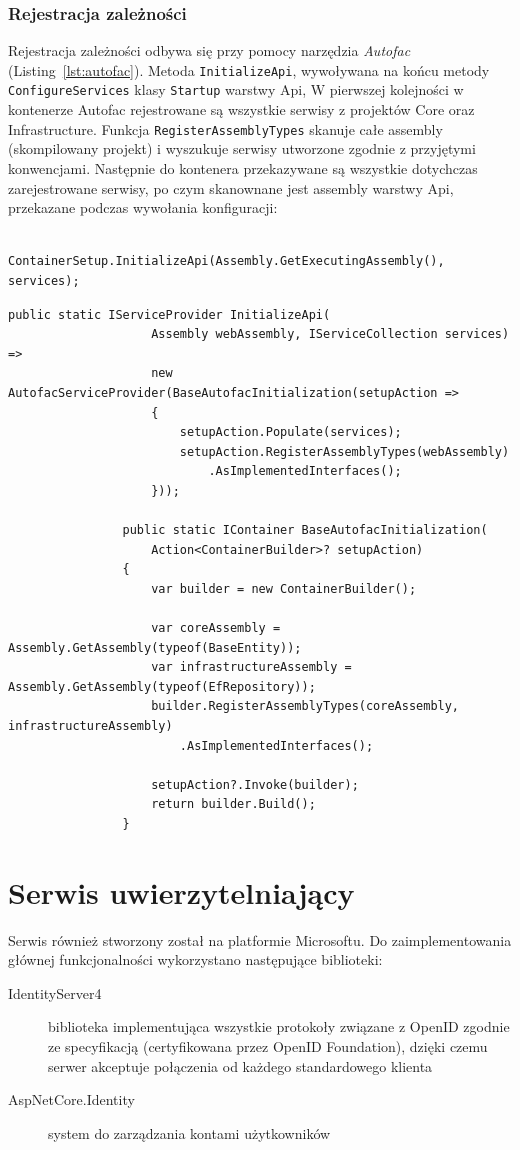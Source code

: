 		\subsubsection*{Rejestracja zależności}
			Rejestracja zależności odbywa się przy pomocy narzędzia \emph{Autofac} (Listing~\ref{lst:autofac}).
			Metoda \verb|InitializeApi|, wywoływana na końcu metody \verb|ConfigureServices| klasy \verb|Startup| warstwy Api,
			W pierwszej kolejności w kontenerze Autofac rejestrowane są wszystkie serwisy z projektów Core oraz Infrastructure.
			Funkcja \verb|RegisterAssemblyTypes| skanuje całe assembly (skompilowany projekt) i wyszukuje serwisy utworzone zgodnie z przyjętymi konwencjami.
			Następnie do kontenera przekazywane są wszystkie dotychczas zarejestrowane serwisy,
			po czym skanownane jest assembly warstwy Api, przekazane podczas wywołania konfiguracji:
			\begin{lstlisting}
				ContainerSetup.InitializeApi(Assembly.GetExecutingAssembly(), services);
			\end{lstlisting}

			\begin{lstlisting}[label=lst:autofac, caption=Rejestracja zależności wykorzystująca Autofac, float=h]
				public static IServiceProvider InitializeApi(
					Assembly webAssembly, IServiceCollection services) =>
					new AutofacServiceProvider(BaseAutofacInitialization(setupAction =>
					{
						setupAction.Populate(services);
						setupAction.RegisterAssemblyTypes(webAssembly)
							.AsImplementedInterfaces();
					}));
	
				public static IContainer BaseAutofacInitialization(
					Action<ContainerBuilder>? setupAction)
				{
					var builder = new ContainerBuilder();
		
					var coreAssembly = Assembly.GetAssembly(typeof(BaseEntity));
					var infrastructureAssembly = Assembly.GetAssembly(typeof(EfRepository));
					builder.RegisterAssemblyTypes(coreAssembly, infrastructureAssembly)
						.AsImplementedInterfaces();
		
					setupAction?.Invoke(builder);
					return builder.Build();
				}
			\end{lstlisting}
	
\section{Serwis uwierzytelniający}
	Serwis również stworzony został na platformie Microsoftu.
	Do zaimplementowania głównej funkcjonalności wykorzystano następujące biblioteki:
	\begin{description}
		\item[IdentityServer4] biblioteka implementująca wszystkie protokoły związane z OpenID zgodnie ze specyfikacją (certyfikowana przez OpenID Foundation),
			dzięki czemu serwer akceptuje połączenia od każdego standardowego klienta
		\item[AspNetCore.Identity] system do zarządzania kontami użytkowników
	\end{description}

